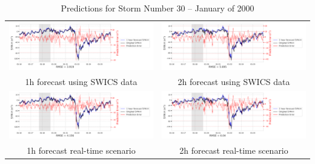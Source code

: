 \documentclass[draft,sw]{agutexSI2019}
\begin{document}
\begin{table}
\centering
\begin{tabular}{cc}
\includegraphics[width=0.49\linewidth]{paper_plots_shade/1h_swics/1h_swics_storm_30.png}
&
\includegraphics[width=0.49\linewidth]{paper_plots_shade/2h_swics/2h_swics_storm_30.png}
\\
1h forecast using SWICS data & 2h forecast using SWICS data
\vspace*{12pt}
\\
\includegraphics[width=0.49\linewidth]{paper_plots_shade/1h_rt/1h_rt_storm_30.png}
&
\includegraphics[width=0.49\linewidth]{paper_plots_shade/2h_rt/2h_rt_storm_30.png}
\\
1h forecast real-time scenario & 2h forecast real-time scenario 
\vspace*{12pt}
\\
\end{tabular}
\caption{Predictions for Storm Number 30 -- January of 2000}
\label{storm-30}
\end{table}
\end{document}
